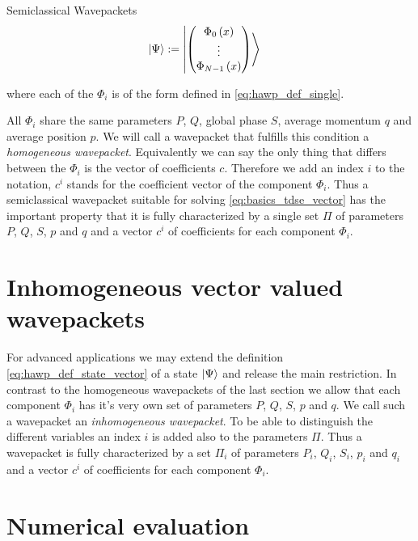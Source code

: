 \begin{chapter}{Semiclassical Wavepackets}
\begin{align} \label{eq:hawp_def_state_vector}
  \Ket{\Psi} & := \Ket{ \begin{pmatrix}
                         \Phi_0\left( x \right) \\
                         \vdots \\
                         \Phi_{N-1}\left( x \right) \\
                       \end{pmatrix}}
\end{align}

where each of the $\Phi_i$ is of the form defined in \eqref{eq:hawp_def_single}.

All $\Phi_i$ share the same parameters $P$, $Q$, global phase $S$, average momentum
$q$ and average position $p$. We will call a wavepacket that fulfills this condition a \emph{homogeneous wavepacket}.
Equivalently we can say the only thing that differs between the $\Phi_i$ is the vector of coefficients $c$.
Therefore we add an index $i$ to the notation, $c^i$ stands for the coefficient vector of the component $\Phi_i$.
Thus a semiclassical wavepacket suitable for solving \eqref{eq:basics_tdse_vector}
has the important property that it is fully characterized by a single set $\Pi$ of
parameters $P$, $Q$, $S$, $p$ and $q$ and a vector $c^i$ of coefficients for each
component $\Phi_i$.


\section{Inhomogeneous vector valued wavepackets}

For advanced applications we may extend the definition \eqref{eq:hawp_def_state_vector}
of a state $\Ket{\Psi}$ and release the main restriction. In contrast to the homogeneous
wavepackets of the last section we allow that each component $\Phi_i$ has it's very
own set of parameters $P$, $Q$, $S$, $p$ and $q$. We call such a wavepacket an
\emph{inhomogeneous wavepacket}. To be able to distinguish the different variables
an index $i$ is added also to the parameters $\Pi$. Thus a wavepacket is fully
characterized by a set $\Pi_i$ of parameters $P_i$, $Q_i$, $S_i$, $p_i$ and $q_i$
and a vector $c^i$ of coefficients for each component $\Phi_i$.


\section{Numerical evaluation}


\end{chapter}

